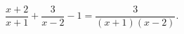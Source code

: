\begin{ex}[type=equation]
	\begin{condition}
		$\dfrac{x + 2}{x + 1} + \dfrac{3}{x - 2} - 1 = \dfrac{3}{(x+1)(x - 2)}.$
	\end{condition}
\end{ex}